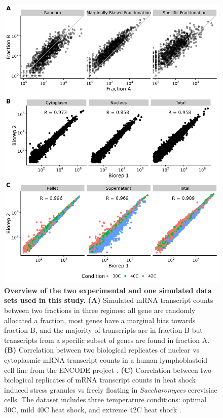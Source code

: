 \documentclass[../main.tex]{subfiles}
\begin{document}
\begin{figure}[p!]

{\centering \includegraphics[width=0.8\linewidth]{figures/fractionation_dataset_summary.png} 

}

\caption[Overview of fractionation data sets.]{\textbf{Overview of the two experimental and one simulated data sets used in this study.} \textbf{(A)}  Simulated mRNA transcript counts between two fractions in three regimes: all gene are randomly allocated a fraction, most genes have a marginal bias towards fraction B, and the majority of transcripts are in fraction B but transcripts from a specific subset of genes are found in fraction A. 
\textbf{(B)} Correlation between two biological replicates of nuclear vs cytoplasmic mRNA transcript counts in a human lymphoblastoid cell line from the ENCODE project \parencite{Dunham2012}. \textbf{(C)} Correlation between two biological replicates of mRNA transcript counts in heat shock induced stress granules vs freely floating in \textit{Saccharomyces} cerevisiae cells. The dataset includes three temperature conditions: optimal 30C, mild 40C heat shock, and extreme 42C heat shock  \parencite{Iserman2020}.} \label{fig:fractionation-datasets}
\end{figure}
\end{document}
